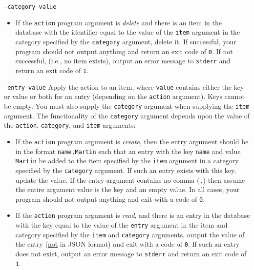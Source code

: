 \documentclass[a4paper]{article}
\begin{document}
\begin{labeling}{ \texttt{--category value} }
\begin{itemize}
        \item If the \texttt{action} program argument is \emph{delete} and there is an item in the database with the identifier equal to the value of the \texttt{item} argument in the category specified by the \texttt{category} argument, delete it. If successful, your program should not output anything and return an exit code of \texttt{0}. If not successful, (i.e., no item exists), output an error message to \texttt{stderr} and return an exit code of \texttt{1}.
        \end{itemize}

    \item[\texttt{--entry value}]
    Apply the action to an item, where \texttt{value} contains either the key or value or both for an entry (depending on the \texttt{action} argument). Keys cannot be empty. You must also supply the \texttt{category} argument when supplying the \texttt{item} argument.  The functionality of the \texttt{category} argument depends upon the value of the \texttt{action}, \texttt{category}, and \texttt{item} arguments:
        \begin{itemize}
    
        \item If the \texttt{action} program argument is \emph{create}, then the entry argument should be in the format \texttt{name,Martin} such that an entry with the key \texttt{name} and value \texttt{Martin} be added to the item specified by the \texttt{item} argument in a category specified by the \texttt{category} argument. If such an entry exists with this key, update the value. If the entry argument contains no comma (\texttt{,}) then assume the entire argument value is the key and an empty value. In all cases, your program should not output anything and exit with a code of \texttt{0}.
    
        \item If the \texttt{action} program argument is \emph{read}, and there is an entry in the database with the key equal to the value of the \texttt{entry} argument in the item and category specified by the \texttt{item} and \texttt{category} arguments, output the value of the entry (\underline{not} in JSON format) and exit with a code of \texttt{0}. If such an entry does not exist, output an error message to \texttt{stderr} and return an exit code of \texttt{1}.
    

\end{itemize}
\end{labeling}
\end{document}
